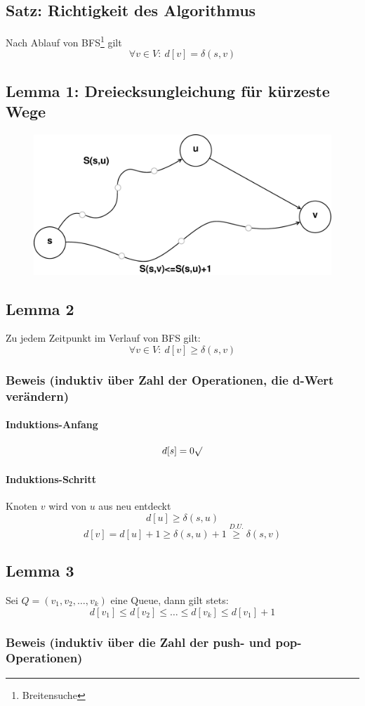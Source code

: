 \subsection{Satz: Richtigkeit des Algorithmus}
Nach Ablauf von BFS\footnote{Breitensuche} gilt 
\[ \forall v\in V: ~ d[v]=\delta(s,v) \]
\subsection{Lemma 1: Dreiecksungleichung für kürzeste Wege}
\begin{figure}[h]
\centering
\includegraphics[width=0.7\linewidth]{16/Grafik/Dreiecksungleichung}
\caption{}
\label{fig:Dreiecksungleichung}
\end{figure}

\subsection{Lemma 2}
Zu jedem Zeitpunkt im Verlauf von BFS gilt:
\[ \forall v\in V:~ d[v] \geq \delta(s,v)\]
\subsubsection{Beweis (induktiv über Zahl der Operationen, die d-Wert verändern)}
\paragraph{Induktions-Anfang} \[ d[s] = 0 \surd\]
\paragraph{Induktions-Schritt} Knoten $v$ wird von $u$ aus neu entdeckt
\[ d[u]\geq \delta(s,u) \]
\[ d[v] = d[u]+1 \geq \delta(s,u)+1 \overset{D.U.}{\geq} \delta(s,v) \]
\subsection{Lemma 3}
Sei $Q=(v_1,v_2,\ldots,v_k)$ eine Queue, dann gilt stets:
\[ d[v_1]\leq d[v_2]\leq\ldots\leq d[v_k]\leq d[v_1]+1 \]
\subsubsection{Beweis (induktiv über die Zahl der push- und pop-Operationen)}
